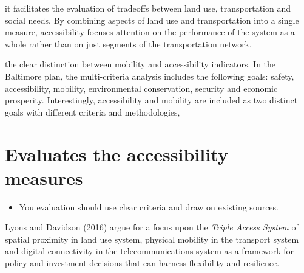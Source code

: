 \documentclass[12pt,]{article}
\providecommand{\tightlist}{%
  \setlength{\itemsep}{0pt}\setlength{\parskip}{0pt}}
\begin{document}
it facilitates the evaluation of tradeoffs between land use,
transportation and social needs. By combining aspects of land use and
transportation into a single measure, accessibility focuses attention on
the performance of the system as a whole rather than on just segments of
the transportation network.

the clear distinction between mobility and accessibility indicators. In
the Baltimore plan, the multi-criteria analysis includes the following
goals: safety, accessibility, mobility, environmental conservation,
security and economic prosperity. Interestingly, accessibility and
mobility are included as two distinct goals with different criteria and
methodologies,

\hypertarget{evaluates-the-accessibility-measures}{%
\section{Evaluates the accessibility
measures}\label{evaluates-the-accessibility-measures}}

\begin{itemize}
\tightlist
\item
  You evaluation should use clear criteria and draw on existing sources.
\end{itemize}

Lyons and Davidson (2016) argue for a focus upon the \emph{Triple Access
System} of spatial proximity in land use system, physical mobility in
the transport system and digital connectivity in the telecommunications
system as a framework for policy and investment decisions that can
harness flexibility and resilience.
\end{document}
